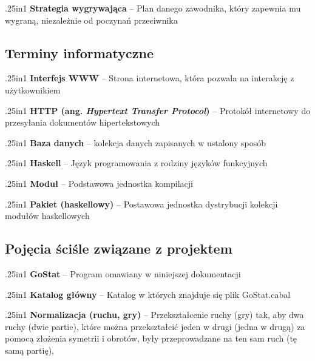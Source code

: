 \documentclass[12pt,leqno]{article}
\newcommand{\entry}[2]{
 \begin{hangparas}{.25in}{1}
  \noindent \textbf{#1} -- #2 \\
 \end{hangparas}
}
\begin{document}
\entry{Strategia wygrywająca}{Plan danego zawodnika, który zapewnia mu wygraną, niezależnie od poczynań przeciwnika}

\subsection{Terminy informatyczne}

\entry{Interfejs WWW}{Strona internetowa, która pozwala na interakcję z użytkownikiem}

\entry{HTTP (ang. \emph{Hypertext Transfer Protocol})}{Protokół internetowy do przesyłania dokumentów hipertekstowych}

\entry{Baza danych}{kolekcja danych zapisanych w ustalony sposób}

\entry{Haskell}{Język programowania z rodziny języków funkcyjnych}

\entry{Moduł}{Podstawowa jednostka kompilacji}

\entry{Pakiet (haskellowy)}{Postawowa jednostka dystrybucji kolekcji modułów haskellowych}

\subsection{Pojęcia ściśle związane z projektem}

\entry{GoStat}{Program omawiany w niniejszej dokumentacji}

\entry{Katalog główny}{Katalog w których znajduje się plik GoStat.cabal}

\entry{Normalizacja (ruchu, gry)}{Przekształcenie ruchy (gry) tak, aby dwa ruchy (dwie partie), które można przekształcić jeden
w drugi (jedna w drugą) za pomocą złożenia symetrii i obrotów, były przeprowadzane na ten sam ruch (tę samą partię),}
\end{document}
